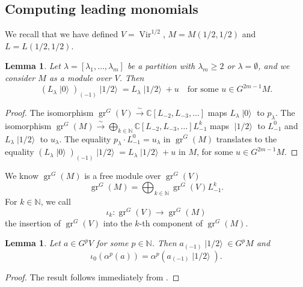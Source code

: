 \documentclass[a4paper, 12pt, reqno]{amsart}
\newtheorem{lemma}[theorem]{Lemma}
\theoremstyle{remark}
\numberwithin{equation}{subsection}
\DeclareMathOperator{\Vir}{Vir}
\DeclareMathOperator{\gr}{gr}
\DeclareMathOperator{\vac}{|0\rangle}
\DeclareMathOperator{\vachalf}{|1/2\rangle}
\begin{document}
\subsection{Computing leading monomials}
\label{sec:comp-lead-monom}

We recall that we have defined $V = \Vir^{1/2}$, $M = M(1/2, 1/2)$ and $L = L(1/2, 1/2)$.

\begin{lemma}
  \label{lmm:31}
  Let $\lambda = [\lambda_1, \dots, \lambda_m]$ be a partition with $\lambda_m \ge 2$ or $\lambda = \emptyset$, and we consider $M$ as a module over $V$.
  Then
  \begin{equation*}
    (L_{\lambda}\vac)_{(-1)}\vachalf = L_{\lambda}\vachalf + u \quad \text{for some }u \in G^{2m - 1}M.
  \end{equation*}
\end{lemma}

\begin{proof}
  The isomorphism $\gr^G(V) \xrightarrow{\sim} \mathbb{C}[L_{-2}, L_{-3}, \dots]$ maps $L_{\lambda}\vac$ to $p_{\lambda}$.
  The isomorphism $\gr^G(M) \xrightarrow{\sim} \bigoplus_{k \in \mathbb{N}}\mathbb{C}[L_{-2}, L_{-3}, \dots]L_{-1}^k$ maps $\vachalf$ to $L_{-1}^0$ and $L_{\lambda}\vachalf$ to $u_{\lambda}$.
  The equality $p_{\lambda}\cdot L_{-1}^0 = u_{\lambda}$ in $\gr^G(M)$ translates to the equality $(L_{\lambda}\vac)_{(-1)}\vachalf = L_{\lambda}\vachalf + u$ in $M$, for some $u \in G^{2m - 1}M$.
\end{proof}

We know $\gr^G(M)$ is a free module over $\gr^G(V)$
\begin{equation*}
  \gr^G(M) = \bigoplus_{k \in \mathbb{N}}\gr^G(V)L_{-1}^k.
\end{equation*}
For $k \in \mathbb{N}$, we call
\begin{equation*}
  \iota_k: \gr^G(V) \to \gr^G(M)
\end{equation*}
the insertion of $\gr^G(V)$ into the $k$-th component of $\gr^G(M)$.

\begin{lemma}
  \label{lmm:32}
  Let $a \in G^pV$ for some $p \in \mathbb{N}$.
  Then $a_{(-1)}\vachalf \in G^pM$ and
  \begin{equation*}
    \iota_0(\alpha^p(a)) = \alpha^p(a_{(-1)}\vachalf).
  \end{equation*}
\end{lemma}

\begin{proof}
  The result follows immediately from .
\end{proof}
\end{document}
